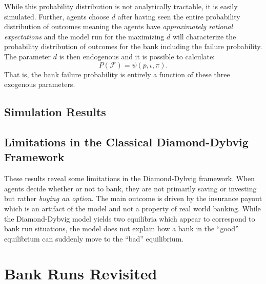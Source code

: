 \documentclass[12pt]{article}
\begin{document}
\begin{doublespace}
While this probability distribution is not analytically tractable, it is easily simulated. Further, agents choose $d$ after having seen the entire probability distribution of outcomes meaning the agents have \emph{approximately rational expectations} and the model run for the maximizing $d$ will characterize the probability distribution of outcomes for the bank including the failure probability. The parameter $d$ is then endogenous and it is possible to calculate:
$$P\left(\mathcal{F}\right)=\psi\left(p,\iota,\pi\right).$$ 
That is, the bank failure probability is entirely a function of these three exogenous parameters. 
\subsection{Simulation Results}


\subsection{Limitations in the Classical Diamond-Dybvig Framework}


These results reveal some limitations in the Diamond-Dybvig framework. When agents
decide whether or not to bank, they are not primarily saving or investing but 
rather \emph{buying an option}. The main outcome is driven by the insurance 
payout which is an artifact of the model and not a property of real world banking.
While the Diamond-Dybvig model yields two equilibria which appear to correspond 
to bank run situations, the model does not explain how a bank in the 
``good'' equilibrium can suddenly move to the ``bad'' equilibrium. 



\section{Bank Runs Revisited}



\end{doublespace}
\end{document}

